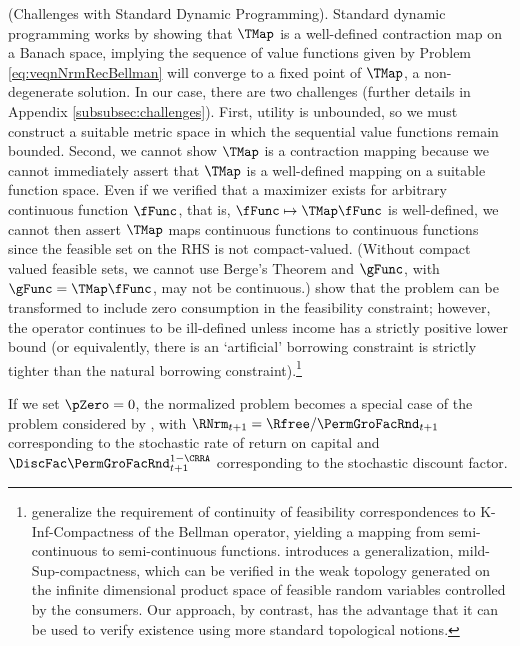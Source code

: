 \documentclass[BufferStockTheory]{subfiles}
\begin{document}
\begin{remark} (Challenges with Standard Dynamic Programming).
Standard dynamic programming works by showing that $\TMap$ is a well-defined contraction map on a Banach space, implying the sequence of value functions given by Problem \ref{eq:veqnNrmRecBellman} will converge to a fixed point of $\TMap$, a non-degenerate solution.  In our case, there are two challenges (further details in Appendix \ref{subsubsec:challenges}). First, utility is unbounded, so we must construct a suitable metric space in which the sequential value functions remain bounded. Second, we cannot show  $\TMap$ is a contraction mapping because we cannot immediately assert that $\TMap$ is a well-defined mapping on a suitable function space. Even if we verified that a maximizer exists for arbitrary continuous function $\fFunc$, that is, $\fFunc\mapsto\TMap \fFunc$ is well-defined, we cannot then assert $\TMap$ maps continuous functions to continuous functions since the feasible set on the RHS is not compact-valued. (Without compact valued feasible sets, we cannot use  Berge's Theorem and $\gFunc$, with $\gFunc = \TMap\fFunc$, may not be continuous.) \cite{maUnboundedDP} show that the problem can be transformed to include zero consumption in the feasibility constraint; however, the operator continues to be ill-defined unless income has a strictly positive lower bound (or equivalently, there is an `artificial' borrowing constraint is strictly tighter than the natural borrowing constraint).\footnote{\cite{Feinberg2012} generalize the requirement of continuity of feasibility correspondences to K-Inf-Compactness of the Bellman operator, yielding a mapping from semi-continuous to semi-continuous functions. \cite{Shanker2017a} introduces a generalization, mild-Sup-compactness, which can be verified in the weak topology generated on the infinite dimensional product space of feasible random variables controlled by the consumers. Our approach, by contrast, has the advantage that it can be used to verify existence using more standard topological notions.} 
\end{remark}

\begin{remark}\label{remark:stochdiscMST}
If we set $\pZero=0$, the normalized problem becomes a special case of the problem considered by \cite{mstIncFluct}, with $\RNrm_{t+1}=\Rfree/\PermGroFacRnd_{t+1}$ corresponding to the stochastic rate of return on capital and $\DiscFac \PermGroFacRnd_{t+1}^{1-\CRRA}$  corresponding to the stochastic discount factor.
\end{remark}
\end{document}

